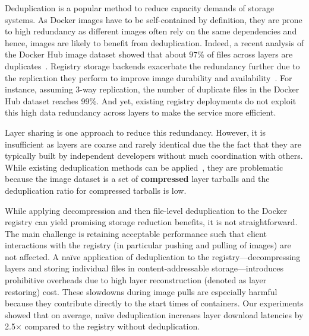 Deduplication is a popular method to reduce capacity demands of storage systems.
%
As Docker images have to be self-contained by definition, they are prone to high
redundancy as different images often rely on the same dependencies and hence,
images are likely to benefit from deduplication.
%
Indeed, a recent analysis of the
Docker Hub image dataset showed that about $97$\% of files across layers are
duplicates~\cite{dedupanalysis}.
%
%
Registry storage backends exacerbate the redundancy further due to the
replication they perform to improve image durability and
availability~\cite{Bonvin:2010:SFS:1807128.1807162}.
%
For instance, assuming 3-way replication, the number of duplicate files in the
Docker Hub dataset reaches 99\%.
%
And yet, existing registry deployments do not exploit this high data redundancy
across layers to make the service more efficient.

Layer sharing is one approach to reduce this redundancy.
%
However, it is insufficient as layers are coarse and rarely identical due the the
fact that they are typically built by independent developers without much coordination
with others.
%
While existing deduplication methods can be applied~\cite{dedup1,dedup2,dedup3}, they
are problematic because 
the image dataset is a set of \textbf{compressed} layer tarballs
and the deduplication ratio for compressed tarballs is low.


While applying decompression and then file-level deduplication to the Docker registry 
can yield promising storage
reduction benefits, it is not straightforward.
%
The main challenge is retaining acceptable performance such that client
interactions with the registry (in particular pushing and pulling of images)
are not affected.
%
A na\"{i}ve application of deduplication to the registry---decompressing
layers and storing individual files in content-addressable storage---introduces
prohibitive overheads due to high layer reconstruction 
(denoted as layer restoring) cost.
%
These slowdowns during image pulls are especially
harmful because they contribute directly to the start times of containers.
%
Our experiments showed that on average, na\"{i}ve deduplication increases layer
download latencies by 2.5$\times$ compared to the registry without deduplication.

